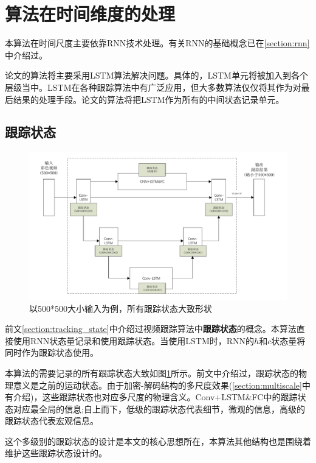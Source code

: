 \section{算法在时间维度的处理}
\par
本算法在时间尺度主要依靠RNN技术处理。有关RNN的基础概念已在\ref{section:rnn}中介绍过。
\par
论文的算法将主要采用LSTM算法解决问题。具体的，LSTM单元将被加入到各个层级当中。LSTM在各种跟踪算法中有广泛应用，但大多数算法仅仅将其作为对最后结果的处理手段。论文的算法将把LSTM作为所有的中间状态记录单元。

\subsection{跟踪状态}
\par
\begin{figure}
    \centering
    \includegraphics[width = 1.\textwidth]{chap/img/tracking_state.pdf}
    \caption{以500*500大小输入为例，所有跟踪状态大致形状}
    \label{fig:tracking_state}
\end{figure}
\par
前文\ref{section:tracking_state}中介绍过视频跟踪算法中\textbf{跟踪状态}的概念。本算法直接使用RNN状态量记录和使用跟踪状态。当使用LSTM时，RNN的$h$和$c$状态量将同时作为跟踪状态使用。
\par
本算法的需要记录的所有跟踪状态大致如图\ref{fig:tracking_state}所示。前文中介绍过，跟踪状态的物理意义是之前的运动状态。由于加密-解码结构的多尺度效果(\ref{section:multiscale}中有介绍)，这些跟踪状态也对应多尺度的物理含义。Conv+LSTM\&FC中的跟踪状态对应最全局的信息;自上而下，低级的跟踪状态代表细节，微观的信息，高级的跟踪状态代表宏观信息。
\par
这个多级别的跟踪状态的设计是本文的核心思想所在，本算法其他结构也是围绕着维护这些跟踪状态设计的。

